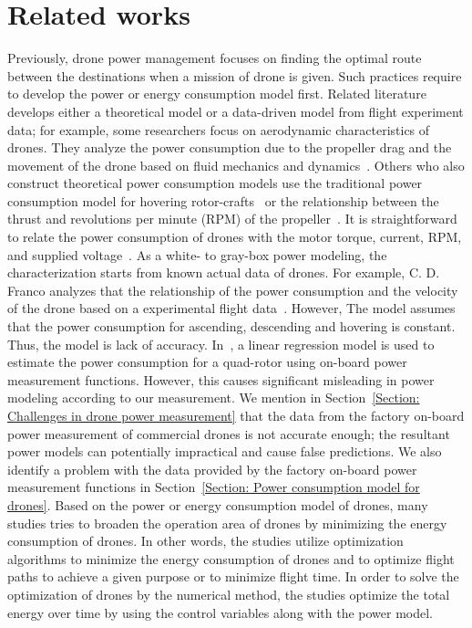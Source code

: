 \documentclass[journal]{./template/IEEEtran}
\begin{document}
\section{Related works}

Previously, drone power management focuses on finding the optimal route between the destinations when a mission of drone is given.
Such practices require to develop the power or energy consumption model first. 
Related literature develops either a theoretical model or a data-driven model from flight experiment data; for example, some researchers focus on aerodynamic characteristics of drones.
They analyze the power consumption due to the propeller drag and the movement of the drone based on fluid mechanics and dynamics~\cite{ref_3}. 
Others who also construct theoretical power consumption models use the traditional power consumption model for hovering rotor-crafts~\cite{ref_4} 
or the relationship between the thrust and revolutions per minute (RPM) of the propeller~\cite{ref_5}. 
It is straightforward to relate the power consumption of drones with the motor torque, current, RPM, and supplied voltage~\cite{ref_6,ref_7}. 
As a white- to gray-box power modeling, the characterization starts from known actual data of drones. For example, C. D. Franco analyzes that the relationship of the power consumption and the velocity of the drone based on a experimental flight data~\cite{ref_8}.  
However, The model assumes that the power consumption for ascending, descending and hovering is constant. Thus, the model is lack of accuracy.
In~\cite{ref_9}, a linear regression model is used to estimate the power consumption for a quad-rotor using on-board power measurement functions. 
However, this causes significant misleading in power modeling according to our measurement.
We mention in Section~\ref{Section: Challenges in drone power measurement} that the data from the factory on-board power measurement of commercial drones is not accurate enough; the resultant power models can potentially impractical and cause false predictions.
We also identify a problem with the data provided by the factory on-board power measurement functions in Section~\ref{Section: Power consumption model for drones}.
Based on the power or energy consumption model of drones, many studies tries to broaden the operation area of drones by minimizing the energy consumption of drones.
In other words, the studies utilize optimization algorithms to minimize the energy consumption of drones and to optimize flight paths to achieve a given purpose or to minimize flight time.
In order to solve the optimization of drones by the numerical method, the studies optimize the total energy over time by using the control variables along with the power model. 
\end{document}
